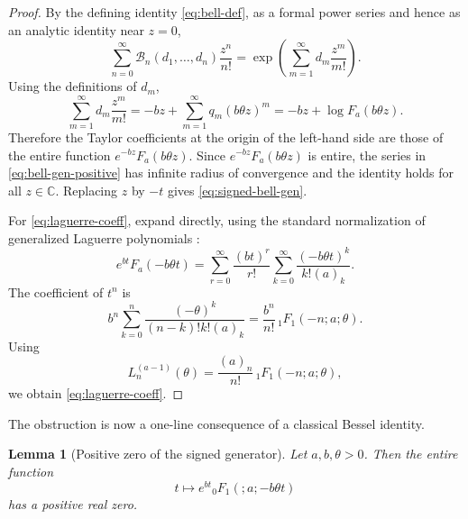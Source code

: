 ﻿\documentclass[preprint,12pt,authoryear]{elsarticle}
\newtheorem{lemma}{Lemma}
\begin{document}
\begin{proof}
By the defining identity \eqref{eq:bell-def}, as a formal power series and hence as an analytic identity near \(z=0\),
\begin{equation}
\sum_{n=0}^{\infty}
\mathcal B_n(d_1,\dots,d_n)\frac{z^n}{n!}
=
\exp\left(\sum_{m=1}^{\infty}d_m\frac{z^m}{m!}\right).
\end{equation}
Using the definitions of \(d_m\),
\begin{equation}
\sum_{m=1}^{\infty}d_m\frac{z^m}{m!}
=
-bz+\sum_{m=1}^{\infty}q_m(b\theta z)^m
=
-bz+\log F_a(b\theta z).
\end{equation}
Therefore the Taylor coefficients at the origin of the left-hand side are those of the entire function \(e^{-bz}F_a(b\theta z)\).  Since \(e^{-bz}F_a(b\theta z)\) is entire, the series in \eqref{eq:bell-gen-positive} has infinite radius of convergence and the identity holds for all \(z\in\mathbb C\).  Replacing \(z\) by \(-t\) gives \eqref{eq:signed-bell-gen}.

For \eqref{eq:laguerre-coeff}, expand directly, using the standard normalization of generalized Laguerre polynomials \cite[Eq.~18.5.12]{DLMF}:
\begin{equation}
e^{bt}F_a(-b\theta t)
=
\sum_{r=0}^{\infty}\frac{(bt)^r}{r!}
\sum_{k=0}^{\infty}
\frac{(-b\theta t)^k}{k!(a)_k}.
\end{equation}
The coefficient of \(t^n\) is
\begin{equation}
b^n\sum_{k=0}^{n}
\frac{(-\theta)^k}{(n-k)!k!(a)_k}
=
\frac{b^n}{n!}\,
{}_1F_1(-n;a;\theta).
\end{equation}
Using
\begin{equation}
L_n^{(a-1)}(\theta)
=
\frac{(a)_n}{n!}\,{}_1F_1(-n;a;\theta),
\end{equation}
we obtain \eqref{eq:laguerre-coeff}.
\end{proof}

The obstruction is now a one-line consequence of a classical Bessel identity.

\begin{lemma}[Positive zero of the signed generator]
\label{lem:positive-zero}
Let \(a,b,\theta>0\).  Then the entire function
\begin{equation}
t\mapsto e^{bt}{}_0F_1(;a;-b\theta t)
\end{equation}
has a positive real zero.
\end{lemma}
\end{document}
